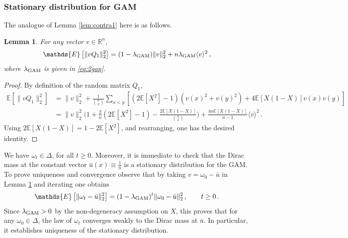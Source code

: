 \documentclass[11pt,reqno]{amsart}
\newtheorem{lemma}[theorem]{Lemma}
\theoremstyle{remark}
\theoremstyle{definition}
\numberwithin{equation}{section}
\numberwithin{figure}{section}
\newcommand{\E}{\mathds{E}}
\newcommand{\R}{\mathbb{R}}
\newcommand{\quadre}[1]{\left[#1\right]}
\let\D=\Delta \let\F=\Phi  \let\G=\Gamma  \let\L=\Lambda \let\The=\Theta
\begin{document}
\subsubsection{Stationary distribution for GAM} 
The analogue of Lemma \ref{lem:contra1} here is as follows. 
\begin{lemma}\label{lem:contra2}
	For any vector $v\in\R^n$, 
	\begin{equation}
		\E\quadre{\|vQ_1\|_2^2}=	(1-\lambda_{\rm GAM})\|v\|_2^2+n\lambda_{\rm GAM}  \langle v\rangle^2\,, %
			\end{equation} 
			where 
		$\lambda_{\rm GAM}$ is given in \eqref{eq:2gap}.
\end{lemma}
\begin{proof}
By definition of the random matrix  $Q_1$,
\begin{align*}
\E\quadre{\|vQ_1\|_2^2}&=	\|v\|_2^2 +\frac1{\binom{n}{2}}\sum_{x<y}\left[(2\E[X^2]-1)(v(x)^2+v(y)^2) + 4\E[X(1-X)]v(x)v(y)\right]
\\
& = \|v\|_2^2 \Big(1+\frac2n(2\E[X^2]-1) - \frac{2\E[X(1-X)]}{\binom{n}{2}}\Big) + \frac{4n\E[X(1-X)]}{n-1}\langle v\rangle^2\,.
\end{align*}
Using $2\E[X(1-X)]=1-2\E[X^2]$, and rearranging, one has the desired identity. 
\end{proof}
We have $\omega_t\in\D$, for all $t\ge 0$. Moreover, it is immediate to check that the Dirac mass at the constant vector $\bar u(x)\equiv \frac1n$ is a stationary distribution for the GAM. To prove uniqueness and convergence observe that by taking $v=\omega_0-\bar u$ in Lemma \ref{lem:contra2} and iterating one obtains
 \begin{equation}\label{eq:kmpco2}
\E\quadre{\|\omega_t-\bar u\|_2^2}	=(1-\lambda_{\rm GAM})^t\|\omega_0-\bar u\|_2^2\,, \qquad t\geq 0\,.
\end{equation}
Since $\lambda_{\rm GAM}>0$ by the non-degeneracy assumption on $X$, this proves that for any $\omega_0\in\D$, the law of $\omega_t$ converges weakly to the Dirac mass at $\bar u$. In particular, it establishes uniqueness of the stationary distribution. 
\end{document}
